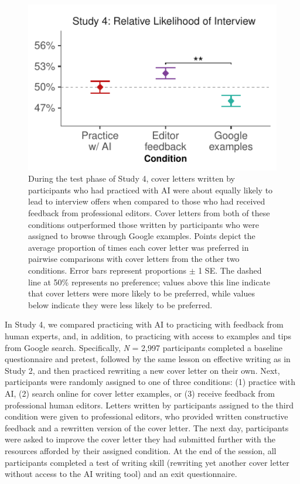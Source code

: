 \documentclass[11pt]{report}
\begin{document}
\begin{mainf}
\begin{figure}[t]
    \centering
    \includegraphics[width=1\linewidth]{ratings3.pdf}
    \caption{During the test phase of Study 4, cover letters written by participants who had practiced with AI were about equally likely to lead to interview offers when compared to those who had received feedback from professional editors. Cover letters from both of these conditions outperformed those written by participants who were assigned to browse through Google examples. Points depict the average proportion of times each cover letter was preferred in pairwise comparisons with cover letters from the other two conditions. Error bars represent proportions $\pm$ 1 SE. The dashed line at 50\% represents no preference; values above this line indicate that cover letters were more likely to be preferred, while values below indicate they were less likely to be preferred.}
    \label{fig:ratings3}
\end{figure}


In Study 4, we compared practicing with AI to practicing with feedback from human experts, and, in addition, to practicing with access to examples and tips from Google search. Specifically, \textit{N} = 2,997 participants  completed a baseline questionnaire and pretest, followed by the same lesson on effective writing as in Study 2, and then practiced rewriting a new cover letter on their own. Next, participants were randomly assigned to one of three conditions: (1) practice with AI, (2) search online for cover letter examples, or (3) receive feedback from professional human editors. Letters written by participants assigned to the third condition were given to professional editors, who provided written constructive feedback and a rewritten version of the cover letter. The next day, participants were asked to improve the cover letter they had submitted further with the resources afforded by their assigned condition. At the end of the session, all participants completed a test of writing skill (rewriting yet another cover letter without access to the AI writing tool) and an exit questionnaire.


\end{mainf}
\end{document}
